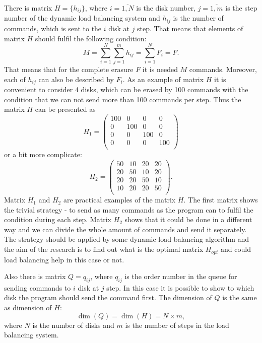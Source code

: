 There is matrix $H=\{h_{ij}\}$, where $i=\overline{1,N}$ is the disk number, $j=\overline{1,m}$ is the step number of the dynamic load balancing system and $h_{ij}$ is the number of commands, which is sent to the $i$ disk at $j$ step. That means that elements of matrix $H$ should fulfil the following condition:
\begin{equation}
\label{eq:load_balancing_matrix}
	M = \sum_{i=1}^{N}\sum_{j=1}^{m}h_{ij} = \sum_{i=1}^{N}F_i = F.
\end{equation}
That means that for the complete erasure $F$ it is needed $M$ commands. Moreover, each of $h_{ij}$ can also be described by $F_i$. As an example of matrix $H$ it is convenient to consider 4 disks, which can be erased by 100 commands with the condition that we can not send more than 100 commands per step. Thus the matrix $H$ can be presented as 
\begin{equation}
	H_1 =
	\begin{pmatrix}
		100 & 0 & 0 & 0 \\
		0 & 100 & 0 & 0 \\
		0 & 0 & 100 & 0 \\
		0 & 0 & 0 & 100 \\
	\end{pmatrix}
\end{equation}
or a bit more complicate:
\begin{equation}
	H_2 =
	\begin{pmatrix}
		50 & 10 & 20 & 20 \\
		20 & 50 & 10 & 20 \\
		20 & 20 & 50 & 10 \\
		10 & 20 & 20 & 50 \\
	\end{pmatrix}.
\end{equation}
Matrix $H_1$ and $H_2$ are practical examples of the matrix $H$. The first matrix shows the trivial strategy - to send as many commands as the program can to fulfil the condition during each step. Matrix $H_2$ shows that it could be done in a different way and we can divide the whole amount of commands and send it separately. The strategy should be applied by some dynamic load balancing algorithm and the aim of the research is to find out what is the optimal matrix $H_{opt}$ and could load balancing help in this case or not.

Also there is matrix $Q=q_{ij}$, where $q_{ij}$ is the order number in the queue for sending commands to $i$ disk at $j$ step. In this case it is possible to show to which disk the program should send the command first. The dimension of $Q$ is the same as dimension of $H$: 
\begin{equation}
	\dim(Q) = \dim(H) = N \times m,
\end{equation}
where $N$ is the number of disks and $m$ is the number of steps in the load balancing system.

